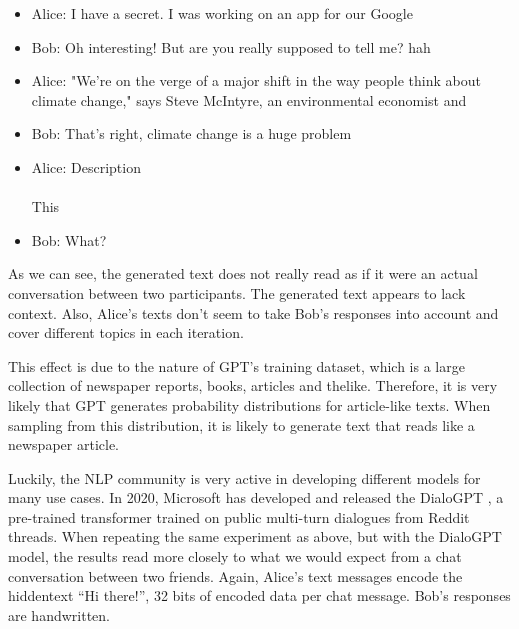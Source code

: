 \begin{example}
\leavevmode
\begin{itemize}
\item Alice: I have a secret. I was working on an app for our Google
\item Bob:   Oh interesting! But are you really supposed to tell me? hah
\item Alice: "We're on the verge of a major shift in the way people think about climate change," says Steve McIntyre, an environmental economist and
\item Bob:   That's right, climate change is a huge problem
\item Alice: Description \\
\\
       This
\item Bob:   What?
\end{itemize}
\end{example}

As we can see, the generated text does not really read as if it were an actual conversation between two participants.
The generated text appears to lack context.
Also, Alice's texts don't seem to take Bob's responses into account and cover different topics in each iteration.

This effect is due to the nature of GPT's training dataset, which is a large collection of newspaper reports, books, articles and thelike.
Therefore, it is very likely that GPT generates probability distributions for article-like texts.
When sampling from this distribution, it is likely to generate text that reads like a newspaper article.

Luckily, the NLP community is very active in developing different models for many use cases.
In 2020, Microsoft has developed and released the DialoGPT \cite{Zhang2020}, a pre-trained transformer trained on public multi-turn dialogues from Reddit threads.
When repeating the same experiment as above, but with the DialoGPT model, the results read more closely to what we would expect from a chat conversation between two friends.
Again, Alice's text messages encode the hiddentext ``Hi there!'', 32 bits of encoded data per chat message.
Bob's responses are handwritten.

